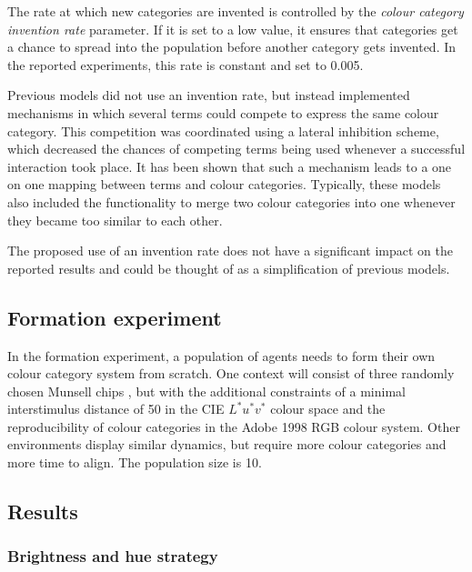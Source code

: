 The rate at which new categories are invented is controlled by the
\emph{colour category invention rate}
parameter. If it is set to a low value, it ensures that categories get
a chance to spread into the population before another category gets
invented. In the reported experiments, this rate is constant and set
to 0.005.

Previous models \citep{steels05coordinating, belpaeme05explaining,
  belpaeme07language} did not use an invention rate, but instead implemented
mechanisms in which several terms could compete to express the same
colour category. This competition was coordinated using a lateral
inhibition scheme, which decreased the chances of competing terms being used
whenever a successful interaction took place. It has been shown that
such a mechanism leads to a one on one mapping between terms and
colour categories. Typically, these models also included the
functionality to merge two colour categories into one whenever they
became too similar to each other. 

The proposed use of an invention rate does not have a significant
impact on the reported results and could be thought of as a
simplification of previous models.

\subsection{Formation experiment}
\label{s:formation-experiment}

In the formation experiment, a population of agents needs to form
their own colour category system from scratch. One context will
consist of three randomly chosen Munsell chips \citep{newhall42final},
but with the additional constraints of a minimal
interstimulus distance of 50 in the CIE $L^*u^*v^*$ colour space and
the reproducibility of colour categories in the Adobe 1998 RGB
colour system. Other environments display similar dynamics, but
require more colour categories and more time to align. The population
size is 10.

\subsection{Results}

\subsubsection{Brightness and hue strategy}

